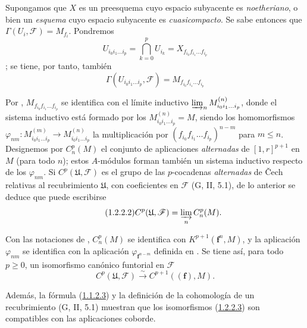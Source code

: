 \begin{env}[1.2.2]
\label{III.1.2.2}
\label{III.1.2.2-fr}
Supongamos que $X$ es un preesquema cuyo espacio subyacente es \emph{noetheriano}, o bien un \emph{esquema} cuyo espacio subyacente es \emph{cuasicompacto}.
Se sabe entonces  que $\Gamma(U_i,\mathcal F)=M_{f_i}$. Pondremos \[
U_{i_0i_1\ldots i_p}=\bigcap_{k=0}^p U_{i_k}
=X_{f_{i_0}f_{i_1}\ldots f_{i_p}}
\]
; se tiene, por tanto, también
\begin{equation}
\label{III.1.2.2.1-fr}
\tag{1.2.2.1}
\Gamma(U_{i_0i_1\ldots i_p},\mathcal F)=M_{f_{i_0}f_{i_1}\ldots f_{i_p}}
\end{equation}

Por , $M_{f_{i_0}f_{i_1}\ldots f_{i_p}}$ se identifica con el límite inductivo $\varinjlim_n M_{i_0i_1\ldots i_p}^{(n)}$, donde el sistema inductivo está formado por los $M_{i_0i_1\ldots i_p}^{(n)}=M$, siendo los homomorfismos $\varphi_{nm}:M_{i_0i_1\ldots i_p}^{(m)}\to
M_{i_0i_1\ldots i_p}^{(n)}$ la multiplicación por $(f_{i_0}f_{i_1}\ldots f_{i_p})^{n-m}$ para $m\leq n$. Designemos por $C_n^p(M)$ el conjunto de aplicaciones \emph{alternadas} de $[1,r]^{p+1}$ en $M$ (para todo $n$); estos $A$-módulos forman también un sistema inductivo respecto de los $\varphi_{nm}$.
Si $C^p(\mathfrak U,\mathcal F)$ es el grupo de las $p$-cocadenas \emph{alternadas} de \v Cech relativas al recubrimiento $\mathfrak U$, con coeficientes en $\mathcal F$ (G, II, 5.1), de lo anterior se deduce que puede escribirse
\begin{equation}
\label{III.1.2.2.2-fr}
\tag{1.2.2.2}
C^p(\mathfrak U,\mathcal F)=\varinjlim_n C_n^p(M).
\end{equation}

Con las notaciones de , $C_n^p(M)$ se identifica con $K^{p+1}(\mathbf f^n,M)$, y la aplicación $\varphi_{nm}$ se identifica con la aplicación $\varphi_{\mathbf f^{n-m}}$ definida en .
Se tiene así, para todo $p\geq0$, un isomorfismo canónico funtorial en $\mathcal F$
\begin{equation}
\label{III.1.2.2.3-fr}
\tag{1.2.2.3}
C^p(\mathfrak U,\mathcal F)\xrightarrow{\sim}C^{p+1}((\mathbf f),M).
\end{equation}

Además, la fórmula (\hyperref[III.1.1.2.3]{1.1.2.3}) y la definición de la cohomología de un recubrimiento (G, II, 5.1) muestran que los isomorfismos (\hyperref[III.1.2.2.3]{1.2.2.3}) son compatibles con las aplicaciones coborde.
\end{env}

